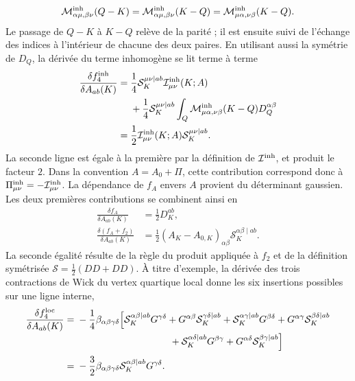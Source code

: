 \begin{equation}
\mathcal M^{\rm inh}_{\alpha\mu,\beta\nu}(Q-K)
=\mathcal M^{\rm inh}_{\alpha\mu,\beta\nu}(K-Q)
=\mathcal M^{\rm inh}_{\mu\alpha,\nu\beta}(K-Q).
\label{eq:core_inhomogeneous_vertex_exchange_symmetry}
\end{equation}
Le passage de $Q-K$ à $K-Q$ relève de la parité ; il est ensuite suivi de
l'échange des indices à l'intérieur de chacune des deux paires. En utilisant aussi la symétrie de $D_Q$, la dérivée du terme
inhomogène se lit terme à terme
\begin{equation}
\begin{aligned}
\frac{\delta f_4^{\rm inh}}{\delta A_{ab}(K)}
={}&\frac14\mathcal S_K^{\mu\nu\mid ab}
\mathcal I^{\rm inh}_{\mu\nu}(K;A)\\
&+\frac14\mathcal S_K^{\mu\nu\mid ab}
\int_Q\mathcal M^{\rm inh}_{\mu\alpha,\nu\beta}(K-Q)
D_Q^{\alpha\beta}\\
={}&\frac12\mathcal I^{\rm inh}_{\mu\nu}(K;A)
\mathcal S_K^{\mu\nu\mid ab}.
\end{aligned}
\label{eq:core_f4inh_variation}
\end{equation}
La seconde ligne est égale à la première par la définition de
$\mathcal I^{\rm inh}$, et produit le facteur $2$. Dans la convention
$A=A_0+\Pi$, cette contribution correspond donc à
$\Pi^{\rm inh}_{\mu\nu}=-\mathcal I^{\rm inh}_{\mu\nu}$.
La dépendance de $f_A$ envers $A$ provient du déterminant gaussien. Les deux
premières contributions se combinent ainsi en
\begin{align}
\frac{\delta f_A}{\delta A_{ab}(K)}&=\frac12D_K^{ab},
\label{eq:core_fA_variation}\\
\frac{\delta(f_A+f_2)}{\delta A_{ab}(K)}
&=\frac12(A_K-A_{0,K})_{\alpha\beta}
\mathcal S_K^{\alpha\beta\mid ab}.
\label{eq:core_fAf2_variation}
\end{align}
La seconde égalité résulte de la règle du produit appliquée à $f_2$ et de la
définition symétrisée
$\mathcal S=\tfrac12(DD+DD)$.
À titre d'exemple, la dérivée des trois contractions de
Wick du vertex quartique local donne les six insertions possibles sur une
ligne interne,
\begin{equation}
\begin{aligned}
\frac{\delta f_4^{\rm loc}}{\delta A_{ab}(K)}
={}&-\frac14\beta_{\alpha\beta\gamma\delta}
\Big[
\mathcal S_K^{\alpha\beta\mid ab}G^{\gamma\delta}
+G^{\alpha\beta}\mathcal S_K^{\gamma\delta\mid ab}
+\mathcal S_K^{\alpha\gamma\mid ab}G^{\beta\delta}
+G^{\alpha\gamma}\mathcal S_K^{\beta\delta\mid ab}\\[-2pt]
&\hspace{34mm}
+\mathcal S_K^{\alpha\delta\mid ab}G^{\beta\gamma}
+G^{\alpha\delta}\mathcal S_K^{\beta\gamma\mid ab}
\Big]\\[2pt]
={}&-\frac32\beta_{\alpha\beta\gamma\delta}
\mathcal S_K^{\alpha\beta\mid ab}G^{\gamma\delta}.
\end{aligned}
\label{eq:core_f4loc_variation}
\end{equation}
